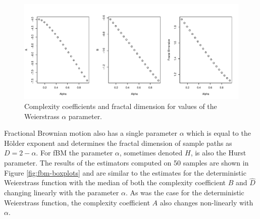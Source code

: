 \begin{figure}[!htbp]
  \begin{center}
  \includegraphics[width = \textwidth, keepaspectratio]{./figs/holder_notrandom-param-plots-notrandom}
  \end{center} 
  \caption{Complexity coefficients and fractal dimension 
    for values of the Weierstrass $\alpha$ parameter.  }
  \label{fig:notrandom-params}
\end{figure}


Fractional Brownian motion also has 
a single parameter $\alpha$ which is equal to
 the H\"older exponent and determines the fractal dimension of
sample paths as $D = 2 - \alpha$. For fBM the 
parameter $\alpha$, sometimes denoted $H$, is also 
the Hurst parameter. The results 
of the estimators computed on 50 samples are shown 
in Figure \ref{fig:fbm-boxplots} and are similar 
to the estimates for the deterministic Weierstrass 
function with the median of both the complexity
coefficient $B$ and $\hat D$ changing linearly
with the parameter $\alpha$. As was
the case for the deterministic Weierstrass 
function, the complexity 
coefficient $A$ also changes non-linearly with 
$\alpha$.




